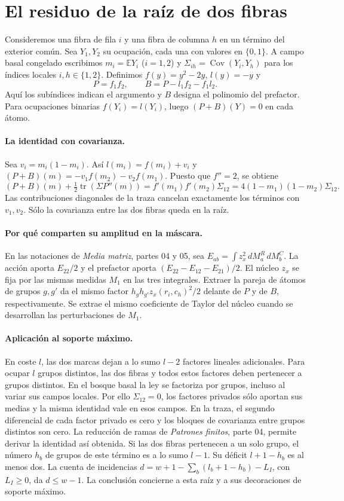 \section{El residuo de la raíz de dos fibras}
Consideremos una fibra de fila $i$ y una fibra de columna $h$ en un término
del exterior común. Sea $Y_1,Y_2$ su ocupación, cada una con valores en $\{0,1\}$.
A campo basal congelado escribimos $m_i=\mathbb E Y_i$ ($i=1,2$) y
$\Sigma_{ih}=\operatorname{Cov}(Y_i,Y_h)$ para los índices locales $i,h\in\{1,2\}$.
Definimos $f(y)=y^2-2y$, $l(y)=-y$ y
\[
 P=f_1f_2,\qquad B=P-l_1f_2-f_1l_2.
\]
Aquí los subíndices indican el argumento y $B$ designa el polinomio del prefactor.
Para ocupaciones binarias $f(Y_i)=l(Y_i)$, luego $(P+B)(Y)=0$ en cada átomo.

\paragraph{La identidad con covarianza.}
Sea $v_i=m_i(1-m_i)$. Así $l(m_i)=f(m_i)+v_i$ y
$(P+B)(m)=-v_1 f(m_2)-v_2 f(m_1)$. Puesto que $f''=2$, se obtiene
\[
 (P+B)(m)+\tfrac12\operatorname{tr}(\Sigma P''(m))
   = f'(m_1)f'(m_2)\Sigma_{12}
   =4(1-m_1)(1-m_2)\Sigma_{12}.
\]
Las contribuciones diagonales de la traza cancelan exactamente los términos
con $v_1,v_2$. Sólo la covarianza entre las dos fibras queda en la raíz.

\paragraph{Por qué comparten su amplitud en la máscara.}
En las notaciones de \emph{Media matriz}, partes 04 y 05, sea
$E_{ab}=\int z_x^2\,dM_a^R\,dM_b^C$. La acción aporta $E_{22}/2$
y el prefactor aporta $(E_{22}-E_{12}-E_{21})/2$. El núcleo $z_x$ se fija
por las mismas medidas $M_1$ en las tres integrales. Extraer la pareja de átomos
de grupos $g,g'$ da el mismo factor $h_g h_{g'}z_x(r_i,c_h)^2/2$ delante
de $P$ y de $B$, respectivamente. Se extrae el mismo coeficiente de Taylor
del núcleo cuando se desarrollan las perturbaciones de $M_1$.

\paragraph{Aplicación al soporte máximo.}
En coste $l$, las dos marcas dejan a lo sumo $l-2$ factores lineales adicionales.
Para ocupar $l$ grupos distintos, las dos fibras y todos estos factores deben
pertenecer a grupos distintos. En el bosque basal la ley se factoriza por grupos,
incluso al variar sus campos locales. Por ello $\Sigma_{12}=0$, los factores
privados sólo aportan sus medias y la misma identidad vale en esos campos.
En la traza, el segundo diferencial de cada factor privado es cero y los
bloques de covarianza entre grupos distintos son cero. La reducción de ramas
de \emph{Patrones finitos}, parte 04, permite derivar la identidad así obtenida.
Si las dos fibras pertenecen a un solo grupo, el número $h_b$ de grupos de
este término es a lo sumo $l-1$. Su déficit $l+1-h_b$ es al menos dos. La cuenta
de incidencias $d=w+1-\sum_b(l_b+1-h_b)-L_I$, con $L_I\ge0$, da $d\le w-1$.
La conclusión concierne a esta raíz y a sus decoraciones de soporte máximo.
